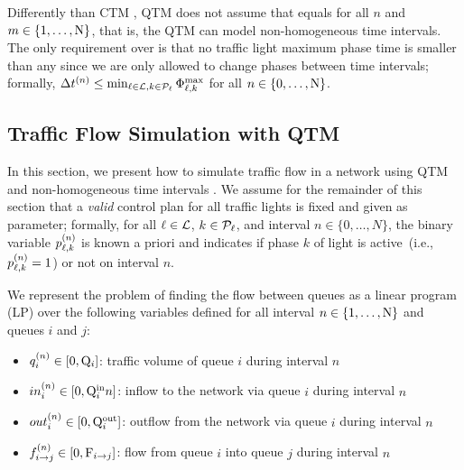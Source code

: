 Differently than CTM \cite{daganzo1994cell,lin2004enhanced}, QTM does not assume
that \DT[n] equals \DT[m] for all $n$ and $m \in \{1,\dots,\Nn\}$, that is, the
QTM can model non-homogeneous time intervals.
%
The only requirement over \DT[n] is that no traffic light maximum phase time is
smaller than any \DT[n] since we are only allowed to change phases between time
intervals; formally, $\DT[n] \le \min_{\tl \in \Lset, k \in \Pset_\tl}
\PTMAX{\tl}{k}$ for all $n \in \{0,\dots,\Nn\}$.






\subsection{Traffic Flow Simulation with QTM}

In this section, we present how to simulate traffic flow in a network using QTM
and non-homogeneous time intervals \DT[].
%
We assume for the remainder of this section that a \emph{valid} control plan for
all traffic lights is fixed and given as parameter;
%
formally, for all $\tl \in \Lset$, $k \in \Pset_\tl$, and interval $n \in
\{0,\dots,N\}$, the binary variable $\p{\tl}{k}$ is known a priori and indicates
if phase $k$ of light \tl is active~(i.e., $\p{\tl}{k} = 1$) or not on interval
$n$.


We represent the problem of finding the flow between queues as a linear program
(LP) over the following variables defined for all interval $n \in
\{1,\dots,\Nn\}$ and queues $i$ and $j$:

\begin{itemize}
%
\item $\q{i} \in [0,\QMAX{i}]$: traffic volume of queue $i$ during interval $n$
%
\item $\inq{i} \in [0,\QIN{i}{n}]$: inflow to the network via queue $i$
during interval $n$
%
\item $\outq{i} \in [0,\QOUT{i}]$: outflow from the network via queue $i$ during
interval $n$
%
\item $\f{i}{j} \in [0,\FMAX{i}{j}]$: flow from queue $i$ into queue $j$ during
interval $n$
%
\end{itemize}



